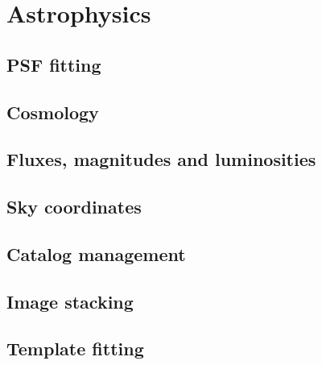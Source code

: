 \section{Astrophysics \label{SEC:support:astro}}

\subsection{PSF fitting \label{SEC:support:astro:psffit}}


\subsection{Cosmology \label{SEC:support:astro:cosmo}}


\subsection{Fluxes, magnitudes and luminosities \label{SEC:support:astro:flux}}


\subsection{Sky coordinates \label{SEC:support:astro:sky}}


\subsection{Catalog management \label{SEC:support:astro:cat}}


\subsection{Image stacking \label{SEC:support:astro:stack}}


\subsection{Template fitting \label{SEC:support:astro:sedfit}}

